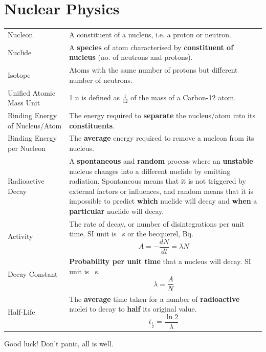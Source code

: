 \documentclass[a4paper,11pt]{article}
\begin{document}
	\section{Nuclear Physics}
	\begin{center}
		\renewcommand{\arraystretch}{1.2}
		\begin{tabular}{@{} l p{10cm} @{}}
			\toprule
			Nucleon & A constituent of a nucleus, i.e. a proton or neutron.\\
			Nuclide & A \textbf{species} of atom characterised by \textbf{constituent of nucleus} (no. of neutrons and protons).\\
			Isotope & Atoms with the same number of protons but different number of neutrons.\\
			Unified Atomic Mass Unit & 1 u is defined as $\frac{1}{12}$ of the mass of a Carbon-12 atom.\\
			Binding Energy of Nucleus/Atom & The energy required to \textbf{separate} the nucleus/atom into its \textbf{constituents}.\\
			Binding Energy per Nucleon & The \textbf{average} energy required to remove a nucleon from its nucleus.\\
			Radioactive Decay & A \textbf{spontaneous} and \textbf{random} process where an \textbf{unstable} nucleus changes into a different nuclide by emitting radiation. Spontaneous means that it is not triggered by external factors or influences, and random means that it is impossible to predict \textbf{which} nuclide will decay and \textbf{when} a \textbf{particular} nuclide will decay.\\
			Activity & The rate of decay, or number of disintegrations per unit time. SI unit is \si{\per\second} or the becquerel, \si{\becquerel}. $$A = -\frac{dN}{dt} = \lambda N$$ \vspace*{-\baselineskip}\\
			Decay Constant & \textbf{Probability per unit time} that a nucleus will decay. SI unit is \si{\per\second}. $$\lambda = \frac{A}{N}$$ \vspace*{-\baselineskip}\\
			Half-Life & The \textbf{average} time taken for a number of \textbf{radioactive} nuclei to decay to \textbf{half} its original value. $$t_{\frac{1}{2}} = \frac{\ln 2}{\lambda}$$ \vspace*{-\baselineskip}\\
			\bottomrule
		\end{tabular}
	\end{center}
	\vspace{2cm}
	\begin{center}
		{\huge Good luck! Don't panic, all is well.}
	\end{center}
\end{document}
